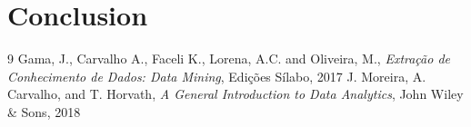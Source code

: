 \documentclass[12pt,a4paper]{article}
\begin{document}
\section{Conclusion}

\begin{thebibliography}{9}
 Gama, J., Carvalho A., Faceli K., Lorena, A.C. and Oliveira, M., \textit{Extração de Conhecimento de Dados: Data Mining}, Edições Sílabo, 2017
 J. Moreira, A. Carvalho, and T. Horvath, \textit{A General Introduction to Data Analytics}, John Wiley \& Sons, 2018
\end{thebibliography}
\end{document}
